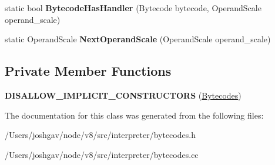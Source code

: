\begin{DoxyCompactItemize}
\item 
static bool {\bfseries Bytecode\+Has\+Handler} (Bytecode bytecode, Operand\+Scale operand\+\_\+scale)\hypertarget{classv8_1_1internal_1_1interpreter_1_1_bytecodes_aec091240b4ac4697d9086609eaeb6b1c}{}\label{classv8_1_1internal_1_1interpreter_1_1_bytecodes_aec091240b4ac4697d9086609eaeb6b1c}

\item 
static Operand\+Scale {\bfseries Next\+Operand\+Scale} (Operand\+Scale operand\+\_\+scale)\hypertarget{classv8_1_1internal_1_1interpreter_1_1_bytecodes_ac2c3af8d2272af38c839b673b2c750bb}{}\label{classv8_1_1internal_1_1interpreter_1_1_bytecodes_ac2c3af8d2272af38c839b673b2c750bb}

\end{DoxyCompactItemize}
\subsection*{Private Member Functions}
\begin{DoxyCompactItemize}
\item 
{\bfseries D\+I\+S\+A\+L\+L\+O\+W\+\_\+\+I\+M\+P\+L\+I\+C\+I\+T\+\_\+\+C\+O\+N\+S\+T\+R\+U\+C\+T\+O\+RS} (\hyperlink{classv8_1_1internal_1_1interpreter_1_1_bytecodes}{Bytecodes})\hypertarget{classv8_1_1internal_1_1interpreter_1_1_bytecodes_a38a7b819fcc1942121f3edb01dd59979}{}\label{classv8_1_1internal_1_1interpreter_1_1_bytecodes_a38a7b819fcc1942121f3edb01dd59979}

\end{DoxyCompactItemize}


The documentation for this class was generated from the following files\+:\begin{DoxyCompactItemize}
\item 
/\+Users/joshgav/node/v8/src/interpreter/bytecodes.\+h\item 
/\+Users/joshgav/node/v8/src/interpreter/bytecodes.\+cc\end{DoxyCompactItemize}
